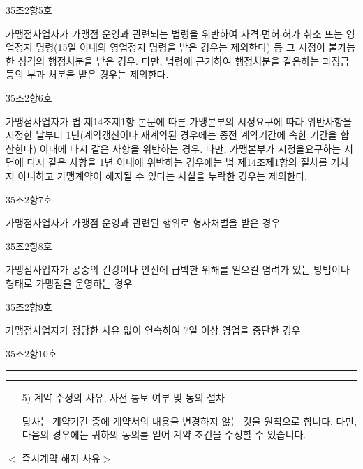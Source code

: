 \documentclass[a5paper,10pt]{oblivoir}
\newcommand\crule[3][black]{\textcolor{#1}{\rule{#2}{#3}}}
\begin{document}
\begin{enumerate}
\begin{tiny}
\begin{Form}
\noindent\dotfill 
35조2항5호

가맹점사업자가 가맹점 운영과 관련되는 법령을 위반하여 자격$\cdot$면허$\cdot$허가 취소 또는 영업정지 명령(15일 이내의 영업정지 명령을 받은 경우는 제외한다) 등 그 시정이 불가능한 성격의 행정처분을 받은 경우. 다만, 법령에 근거하여 행정처분을 갈음하는  과징금 등의 부과 처분을 받은 경우는 제외한다.

\noindent\dotfill 
35조2항6호

가맹점사업자가 법 제14조제1항 본문에 따른 가맹본부의 시정요구에 따라 위반사항을 시정한 날부터 1년(계약갱신이나 재계약된 경우에는 종전 계약기간에 속한 기간을 합산한다) 이내에 다시 같은 사항을 위반하는 경우. 다만, 가맹본부가 시정을요구하는 서면에 다시 같은 사항을 1년 이내에 위반하는 경우에는 법 제14조제1항의 절차를 거치지 아니하고 가맹계약이 해지될 수 있다는 사실을 누락한 경우는 제외한다.

\noindent\dotfill 
35조2항7호


가맹점사업자가 가맹점 운영과 관련된 행위로 형사처벌을 받은 경우

\noindent\dotfill 
35조2항8호

가맹점사업자가 공중의 건강이나 안전에 급박한 위해를 일으킬 염려가 있는 방법이나 형태로 가맹점을 운영하는 경우

\noindent\dotfill 
35조2항9호

가맹점사업자가 정당한 사유 없이 연속하여 7일 이상 영업을 중단한 경우

\noindent\dotfill 
35조2항10호
\end{Form}
\end{tiny}


\newpage
\begin{center}
\crule[red]{4cm}{0.1cm} \crule[blue]{4cm}{0.1cm}
\end{center}
\begin{enumerate}
\item[5)] 계약 수정의 사유, 사전 통보 여부 및 동의 절차

당사는 계약기간 중에 계약서의 내용을 변경하지 않는 것을 원칙으로 합니다. 다만, 다음의 경우에는 귀하의 동의를 얻어 계약 조건을 수정할 수 있습니다.
\end{enumerate}
\begin{tiny}
\begin{center}$<$  즉시계약 해지 사유$>$ \end{center}

\begin{Form}
\def\LayoutCheckField#1#2{%
  \parbox[c][5mm]{5mm}{\centering\footnotesize\strut #1\\#2}%
}
\def\LayoutCheckField#1#2{%
  \makebox[0pt][l]{%
    \makebox[5mm][c]{\footnotesize\strut #1}%
  }%
  #2%
}
\def\DefaultHeightofCheckBox{5mm}
\def\DefaultWidthofCheckBox{5mm}


\end{Form}
\end{tiny}
\end{enumerate}
\end{document}
